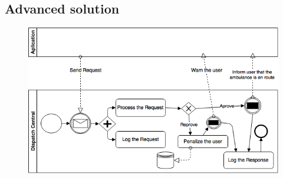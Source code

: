 \documentclass[a4paper,titlepage,11pt]{article}
\begin{document}
\subsection{Advanced solution}
\begin{figure}[h]
    \centering
    \includegraphics[scale=0.60]{img/basic-solution.png}          %
\end{figure}
\end{document}
